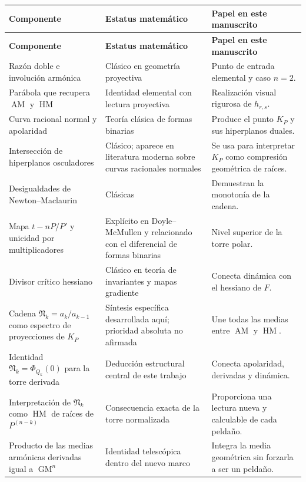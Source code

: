 \documentclass[11pt,oneside]{scrartcl}
\theoremstyle{plainblue}
\theoremstyle{definitionblue}
\theoremstyle{remarkgray}
\newcommand{\AM}{\operatorname{AM}}
\newcommand{\GM}{\operatorname{GM}}
\newcommand{\HM}{\operatorname{HM}}
\newcommand{\cN}{\mathfrak{N}}
\begin{document}
\begin{longtable}{>{\RaggedRight\arraybackslash}p{}
                  >{\RaggedRight\arraybackslash}p{}
                  >{\RaggedRight\arraybackslash}p{}}
\toprule
\textbf{Componente} & \textbf{Estatus matemático} & \textbf{Papel en este manuscrito}\\
\midrule
\endfirsthead
\toprule
\textbf{Componente} & \textbf{Estatus matemático} & \textbf{Papel en este manuscrito}\\
\midrule
\endhead
Razón doble e involución armónica & Clásico en geometría proyectiva & Punto de entrada elemental y caso \(n=2\).\\
\addlinespace
Parábola que recupera \(\AM\) y \(\HM\) & Identidad elemental con lectura proyectiva & Realización visual rigurosa de \(h_{r,s}\).\\
\addlinespace
Curva racional normal y apolaridad & Teoría clásica de formas binarias & Produce el punto \(K_P\) y sus hiperplanos duales.\\
\addlinespace
Intersección de hiperplanos osculadores & Clásico; aparece en literatura moderna sobre curvas racionales normales & Se usa para interpretar \(K_P\) como compresión geométrica de raíces.\\
\addlinespace
Desigualdades de Newton--Maclaurin & Clásicas & Demuestran la monotonía de la cadena.\\
\addlinespace
Mapa \(t-nP/P'\) y unicidad por multiplicadores & Explícito en Doyle--McMullen y relacionado con el diferencial de formas binarias & Nivel superior de la torre polar.\\
\addlinespace
Divisor crítico hessiano & Clásico en teoría de invariantes y mapas gradiente & Conecta dinámica con el hessiano de \(F\).\\
\addlinespace
Cadena \(\cN_k=a_k/a_{k-1}\) como espectro de proyecciones de \(K_P\) & Síntesis específica desarrollada aquí; prioridad absoluta no afirmada & Une todas las medias entre \(\AM\) y \(\HM\).\\
\addlinespace
Identidad \(\cN_k=\Phi_{Q_k}(0)\) para la torre derivada & Deducción estructural central de este trabajo & Conecta apolaridad, derivadas y dinámica.\\
\addlinespace
Interpretación de \(\cN_k\) como \(\HM\) de raíces de \(P^{(n-k)}\) & Consecuencia exacta de la torre normalizada & Proporciona una lectura nueva y calculable de cada peldaño.\\
\addlinespace
Producto de las medias armónicas derivadas igual a \(\GM^n\) & Identidad telescópica dentro del nuevo marco & Integra la media geométrica sin forzarla a ser un peldaño.\\
\bottomrule
\end{longtable}
\end{document}
